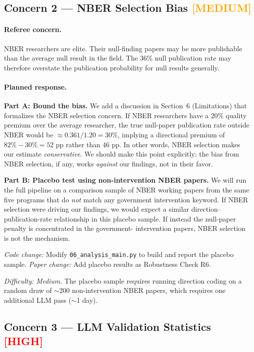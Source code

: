 \documentclass[12pt]{article}
\newcommand{\HIGH}{\textcolor{red}{\textbf{[HIGH]}}}
\newcommand{\MED}{\textcolor{orange}{\textbf{[MEDIUM]}}}
\begin{document}
\subsection{Concern 2 --- NBER Selection Bias \MED}

\paragraph{Referee concern.}
NBER researchers are elite.  Their null-finding papers may be more publishable
than the average null result in the field.  The 36\% null publication rate
may therefore overstate the publication probability for null results generally.

\paragraph{Planned response.}

\textbf{Part A: Bound the bias.}
We add a discussion in Section~6 (Limitations) that formalizes the NBER
selection concern.  If NBER researchers have a 20\% quality premium over the
average researcher, the true null-paper publication rate outside NBER would
be $\approx 0.361 / 1.20 = 30\%$, implying a directional premium of
$82\% - 30\% = 52$ pp rather than 46 pp.  In other words, NBER selection
makes our estimate \textit{conservative}.  We should make this point
explicitly: the bias from NBER selection, if any, works \emph{against} our
findings, not in their favor.

\textbf{Part B: Placebo test using non-intervention NBER papers.}
We will run the full pipeline on a comparison sample of NBER working papers
from the same five programs that do \textit{not} match any government
intervention keyword.  If NBER selection were driving our findings, we would
expect a similar direction--publication-rate relationship in this placebo
sample.  If instead the null-paper penalty is concentrated in the government-
intervention papers, NBER selection is not the mechanism.

\textit{Code change:} Modify \texttt{06\_analysis\_main.py} to build and
report the placebo sample.  \textit{Paper change:} Add placebo results as
Robustness Check R6.

\textit{Difficulty: Medium.}  The placebo sample requires running direction
coding on a random draw of $\sim$200 non-intervention NBER papers, which
requires one additional LLM pass ($\sim$1 day).

\subsection{Concern 3 --- LLM Validation Statistics \HIGH}
\end{document}
